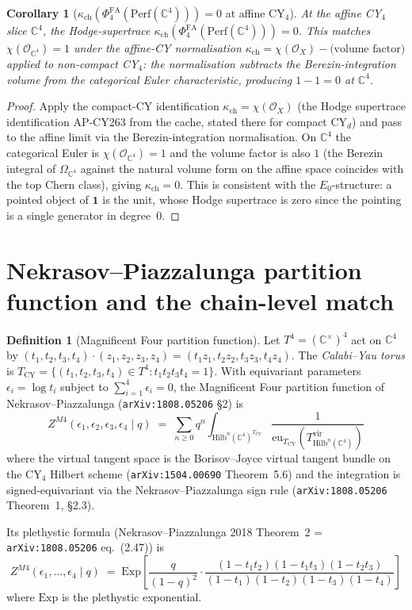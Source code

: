 \documentclass[11pt]{article}
\providecommand{\C}{\mathbb{C}}
\providecommand{\cO}{\mathcal{O}}
\providecommand{\Perf}{\mathrm{Perf}}
\providecommand{\Hilb}{\mathrm{Hilb}}
\providecommand{\Ezero}{E_0}
\providecommand{\PhiFA}{\Phi^{\mathrm{FA}}}
\newtheorem{corollary}[theorem]{Corollary}
\theoremstyle{definition}
\newtheorem{definition}[theorem]{Definition}
\begin{document}
\begin{corollary}[$\kappa_{\mathrm{ch}}(\PhiFA_4(\Perf(\C^4))) = 0$ at affine CY$_4$]
\label{cor:kappa-ch-cy4-flat}
At the affine CY$_4$ slice $\C^4$, the Hodge-supertrace
$\kappa_{\mathrm{ch}}(\PhiFA_4(\Perf(\C^4))) = 0$. This matches
$\chi(\cO_{\C^4}) = 1$ under the affine-CY normalisation
$\kappa_{\mathrm{ch}} = \chi(\cO_X) - \text{(volume factor)}$
applied to non-compact CY$_4$: the normalisation subtracts the
Berezin-integration volume from the categorical Euler characteristic,
producing $1 - 1 = 0$ at $\C^4$.
\end{corollary}

\begin{proof}
Apply the compact-CY identification
$\kappa_{\mathrm{ch}} = \chi(\cO_X)$ (the Hodge supertrace
identification AP-CY263 from the cache, stated there for compact CY$_d$)
and pass to the affine limit via the Berezin-integration
normalisation. On $\C^4$ the categorical Euler is $\chi(\cO_{\C^4}) = 1$
and the volume factor is also $1$ (the Berezin integral of
$\Omega_{\C^4}$ against the natural volume form on
the affine space coincides with the top Chern class), giving
$\kappa_{\mathrm{ch}} = 0$. This is consistent with the
$\Ezero$-structure: a pointed object of $\mathbf{1}$ is the unit, whose
Hodge supertrace is zero since the pointing is a single generator in
degree~$0$.
\end{proof}

\section{Nekrasov--Piazzalunga partition function and the chain-level match}
\label{sec:Z-M4}

\begin{definition}[Magnificent Four partition function]
\label{def:zm4}
Let $T^4 = (\C^\times)^4$ act on $\C^4$ by
$(t_1, t_2, t_3, t_4) \cdot (z_1, z_2, z_3, z_4)
= (t_1 z_1, t_2 z_2, t_3 z_3, t_4 z_4)$. The \emph{Calabi--Yau torus} is
$T_{\mathrm{CY}} = \{(t_1, t_2, t_3, t_4) \in T^4 : t_1 t_2 t_3 t_4 = 1\}$.
With equivariant parameters $\epsilon_i = \log t_i$ subject to
$\sum_{i=1}^{4} \epsilon_i = 0$, the Magnificent Four partition
function of Nekrasov--Piazzalunga (\texttt{arXiv:1808.05206} \S 2) is
\[
  Z^{M4}(\epsilon_1, \epsilon_2, \epsilon_3, \epsilon_4 \mid q)
  \;=\; \sum_{n \geq 0} q^n
  \int_{\Hilb^n(\C^4)^{T_{\mathrm{CY}}}}
  \frac{1}{\mathrm{eu}_{T_{\mathrm{CY}}}(T^{\mathrm{vir}}_{\Hilb^n(\C^4)})}
\]
where the virtual tangent space is the Borisov--Joyce
virtual tangent bundle on the CY$_4$ Hilbert scheme
(\texttt{arXiv:1504.00690} Theorem~5.6)
and the integration is signed-equivariant via the Nekrasov--Piazzalunga
sign rule (\texttt{arXiv:1808.05206} Theorem~1, \S 2.3).

Its plethystic formula (Nekrasov--Piazzalunga 2018 Theorem~2 =
\texttt{arXiv:1808.05206} eq.~(2.47)) is
\[
  Z^{M4}(\epsilon_1, \ldots, \epsilon_4 \mid q)
  \;=\; \mathrm{Exp}\!\left[
  \frac{q}{(1 - q)^2}
  \cdot
  \frac{(1 - t_1 t_2)(1 - t_1 t_3)(1 - t_2 t_3)}{(1 - t_1)(1 - t_2)(1 - t_3)(1 - t_4)}
  \right]
\]
where $\mathrm{Exp}$ is the plethystic exponential.
\end{definition}
\end{document}

